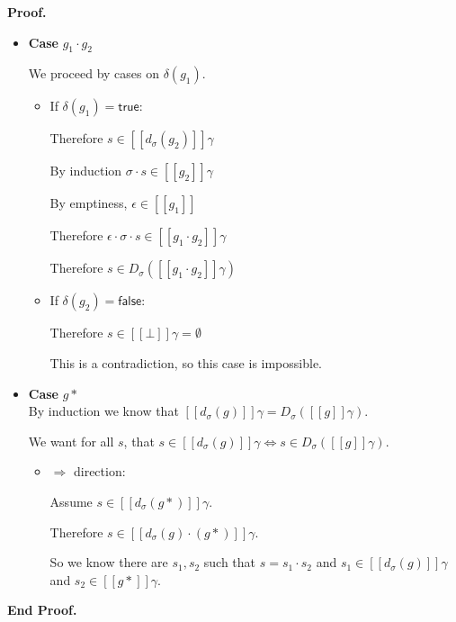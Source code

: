 \documentclass{article}
\newcommand{\true}{\mathsf{true}}
\newcommand{\false}{\mathsf{false}}
\newcommand{\interp}[1]{[\![{#1}]\!]}
\newcommand{\semderiv}[2]{D_{#1}({#2})}
\newcommand{\deriv}[2]{d_{#1}({#2})}
\newcommand{\emptify}[1]{\delta({#1})}
\newenvironment{proof}{\noindent\textbf{Proof.}}{\noindent\textbf{End Proof.}}
\newenvironment{caseblock}{\begin{itemize}}{\end{itemize}}
\newenvironment{case}[1]{\item \textbf{Case} {#1}\\}{}
\begin{document}
\begin{proof}
\begin{caseblock}
\begin{case}{$g_1\cdot g_2$}
\begin{enumerate}
\begin{itemize}
\begin{enumerate}
\begin{itemize}
                    We proceed by cases on $\emptify{g_1}$. 
                    \begin{itemize}
                    \item If $\emptify{g_1} = \true$: 
                        
                      Therefore $s \in \interp{\deriv{\sigma}{g_2}}\gamma$ 
                      
                      By induction $\sigma\cdot s \in \interp{g_2}\gamma$
                      
                      By emptiness, $\epsilon \in \interp{g_1}$
                      
                      Therefore $\epsilon\cdot\sigma\cdot s \in \interp{g_1\cdot g_2}\gamma$
                      
                      Therefore $s \in \semderiv{\sigma}{\interp{g_1\cdot g_2}\gamma}$ 
                    \item If $\emptify{g_2} = \false$: 

                         Therefore $s \in \interp{\bot}{\gamma} = \emptyset$

                         This is a contradiction, so this case is impossible.
                    \end{itemize}
                \end{itemize}
            \end{enumerate}
          \end{itemize}
      \end{enumerate}
    \end{case}

    \begin{case}{$g*$}
      By induction we know that $\interp{\deriv{\sigma}{g}}\gamma = \semderiv{\sigma}{\interp{g}\gamma}$.

      We want for all $s$, that $s \in \interp{\deriv{\sigma}{g}}\gamma \iff s \in \semderiv{\sigma}{\interp{g}\gamma}$. 
      \begin{itemize}
        \item $\Rightarrow$ direction: 

          Assume $s \in \interp{\deriv{\sigma}{g*}}\gamma$. 
          
          Therefore $s \in \interp{\deriv{\sigma}{g}\cdot(g*)}\gamma$. 

          So we know there are $s_1, s_2$ such that $s = s_1\cdot s_2$ and $s_1 \in \interp{\deriv{\sigma}{g}}\gamma$ and $s_2 \in \interp{g*}\gamma$. 
          

\end{itemize}
\end{case}
\end{caseblock}
\end{proof}
\end{document}
